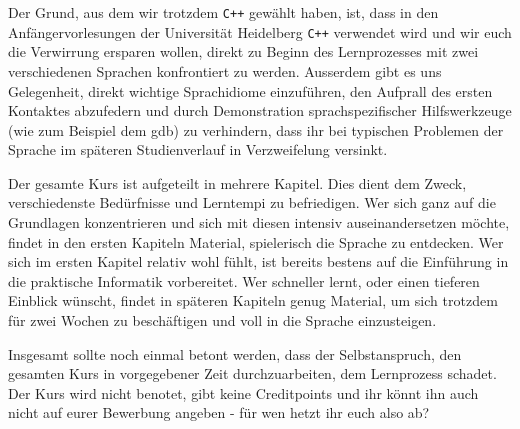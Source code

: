 \documentclass{vorkurs}
\newcommand{\swname}[1]{\texttt{#1}\xspace}
\newcommand{\Cpp}{\swname{C++}}
\begin{document}
Der Grund, aus dem wir trotzdem \Cpp gewählt haben, ist, dass in den
Anfängervorlesungen der Universität Heidelberg \Cpp verwendet wird und wir euch
die Verwirrung ersparen wollen, direkt zu Beginn des Lernprozesses mit zwei
verschiedenen Sprachen konfrontiert zu werden.  Ausserdem gibt es uns
Gelegenheit, direkt wichtige Sprachidiome einzuführen, den Aufprall des ersten
Kontaktes abzufedern und durch Demonstration sprachspezifischer Hilfswerkzeuge
(wie zum Beispiel dem gdb) zu verhindern, dass ihr bei typischen Problemen der
Sprache im späteren Studienverlauf in Verzweifelung versinkt.

Der gesamte Kurs ist aufgeteilt in mehrere Kapitel. Dies dient dem Zweck,
verschiedenste Bedürfnisse und Lerntempi zu befriedigen.  Wer sich ganz auf die
Grundlagen konzentrieren und sich mit diesen intensiv auseinandersetzen möchte,
findet in den ersten Kapiteln Material, spielerisch die Sprache zu entdecken.
Wer sich im ersten Kapitel relativ wohl fühlt, ist bereits bestens auf die
Einführung in die praktische Informatik vorbereitet.  Wer schneller lernt, oder
einen tieferen Einblick wünscht, findet in späteren Kapiteln genug Material, um
sich trotzdem für zwei Wochen zu beschäftigen und voll in die Sprache
einzusteigen.

Insgesamt sollte noch einmal betont werden, dass der Selbstanspruch, den
gesamten Kurs in vorgegebener Zeit durchzuarbeiten, dem Lernprozess schadet.
Der Kurs wird nicht benotet, gibt keine Creditpoints und ihr könnt ihn auch
nicht auf eurer Bewerbung angeben - für wen hetzt ihr euch also ab?

\tableofcontents




\clearpage
{}
\printglossary[type=main, title=Glossar, toctitle=\textbf{Glossar}, nonumberlist]
\end{document}
